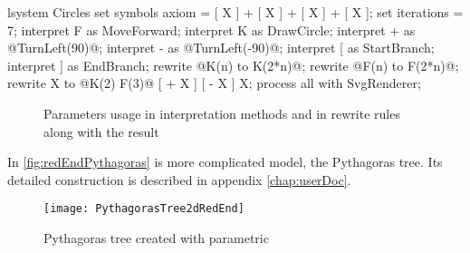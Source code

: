 \newsavebox{\lstBox}
\begin{lrbox}{\lstBox}
\begin{Lsystem50}
lsystem Circles {
	set symbols axiom =	[ X ] +
		[ X ] + [ X ] + [ X ];
	set iterations = 7;
	interpret F as MoveForward;
	interpret K as DrawCircle;
	interpret + as @TurnLeft(90)@;
	interpret - as @TurnLeft(-90)@;
	interpret [ as StartBranch;
	interpret ] as EndBranch;
	rewrite @K(n) to K(2*n)@;
	rewrite @F(n) to F(2*n)@;
	rewrite X to @K(2) F(3)@
		[ + X ] [ - X ] X;
}
process all with SvgRenderer;
\end{Lsystem50}
\end{lrbox}

\begin{figure}[h!]
	\subfloat{
		\usebox{\lstBox}
	} \hfill
	\caption{Parameters usage in \lsystem interpretation methods and in rewrite rules along with the result}
	\label{fig:scParams}
\end{figure}

In \autoref{fig:redEndPythagoras} is more complicated model, the Pythagoras tree.
Its detailed construction is described in appendix \ref{chap:userDoc}.

\begin{figure}[H]
	\centering
	\texttt{[image: PythagorasTree2dRedEnd]}
	\caption{Pythagoras tree created with parametric \lsystem}
	\label{fig:redEndPythagoras}
\end{figure}

































